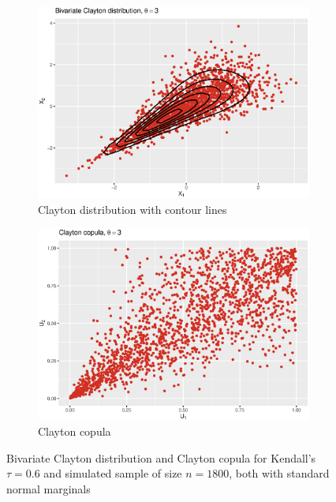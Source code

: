  \begin{figure}[H]
\centering
\begin{subfigure}{.45\textwidth}
  \centering
  \includegraphics[width=\linewidth]{figures/bivariate_clayton.eps}
  \caption{Clayton distribution with contour lines}
  \label{fig:bivariate_clayton}
\end{subfigure}
\begin{subfigure}{.45\textwidth}
  \centering
  \includegraphics[width=\linewidth]{figures/clayton_copula.eps}
  \caption{Clayton copula}
  \label{fig:clayton_copula}
\end{subfigure}
\caption{Bivariate Clayton distribution and Clayton copula for Kendall's $\tau = 0.6$ and simulated sample of size $n = 1800$, both with standard normal marginals}
\label{fig:clayton_plots}
\end{figure}




